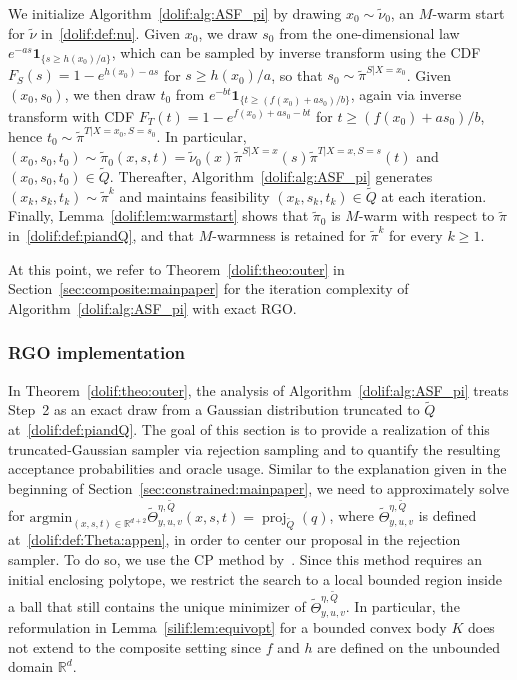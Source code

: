 \documentclass[11pt,letterpaper]{article}
\newcommand{\R}{\mathbb{R}}
\newcommand{\Q}{\widetilde{Q}}
\newcommand{\proj}{\operatorname{proj}}
\newcommand{\argmin}{\mathrm{argmin}  }
\begin{document}
 We initialize Algorithm~\ref{dolif:alg:ASF_pi} by drawing $x_0\sim \tilde{\nu}_0$, an $M$-warm start for $\tilde{\nu}$ in~\eqref{dolif:def:nu}. 
Given $x_0$, we draw $s_0$ from the one-dimensional law $e^{-as}\mathbf{1}_{\{s\ge h(x_0)/a\}}$, which can be sampled by inverse transform using the CDF $F_S(s)=1-e^{h(x_0)-as}$ for $s\ge h(x_0)/a$, so that $s_0\sim \tilde{\pi}^{S |  X=x_0}$. 
Given $(x_0,s_0)$, we then draw $t_0$ from $e^{-bt}\mathbf{1}_{\{t\ge (f(x_0)+as_0)/b\}}$, again via inverse transform with CDF $F_T(t)=1-e^{f(x_0)+as_0-bt}$ for $t\ge (f(x_0)+as_0)/b$, hence $t_0\sim \tilde{\pi}^{T |  X=x_0,S=s_0}$. 
In particular, $(x_0,s_0,t_0)\sim \tilde{\pi}_0(x,s,t)=\tilde{\nu}_0(x) \tilde{\pi}^{S |  X=x}(s) \tilde{\pi}^{T |  X=x,S=s}(t)$ and $(x_0,s_0,t_0)\in \Q$. 
Thereafter, Algorithm~\ref{dolif:alg:ASF_pi} generates $(x_k,s_k,t_k)\sim \tilde{\pi}^k$ and maintains feasibility $(x_k,s_k,t_k)\in \Q$ at each iteration. Finally, 
Lemma~\ref{dolif:lem:warmstart} shows that $\tilde{\pi}_0$ is $M$-warm with respect to $\tilde{\pi}$ in~\eqref{dolif:def:piandQ}, and that $M$-warmness is retained for $\tilde{\pi}^k$ for every $k\ge 1$.

At this point, we refer to Theorem~\ref{dolif:theo:outer} in Section~\ref{sec:composite:mainpaper} for the iteration complexity of Algorithm~\ref{dolif:alg:ASF_pi} with exact RGO.  




\subsubsection{RGO implementation}

In Theorem~\ref{dolif:theo:outer}, the analysis of Algorithm~\ref{dolif:alg:ASF_pi} treats Step~2 as an exact draw from a Gaussian distribution truncated to $\Q$ at~\eqref{dolif:def:piandQ}. The goal of this section is to provide a realization of this truncated-Gaussian sampler via rejection sampling and to quantify the resulting acceptance probabilities and oracle usage. Similar to the explanation given in the beginning of Section~\ref{sec:constrained:mainpaper}, we need to approximately solve for $\argmin_{(x,s,t)\in\R^{d+2}}\widetilde{\Theta}^{\eta,\Q}_{y,u,v}(x,s,t)
=\proj_{\Q}( q)$, where $\widetilde{\Theta}^{\eta,\Q}_{y,u,v}$ is defined at~\eqref{dolif:def:Theta:appen}, in order to center our proposal in the rejection sampler. To do so, we use the CP method by~\cite{jiang2020cuttingplane}. Since this method requires an initial enclosing polytope, we restrict the search to a local bounded region inside a ball that still contains the unique minimizer of $\widetilde{\Theta}^{\eta,\Q}_{y,u,v}$. In particular, the reformulation in Lemma~\ref{silif:lem:equivopt} for a bounded convex body $K$ does not extend to the composite setting since $f$ and $h$ are defined on the unbounded domain $\R^d$.
\end{document}
